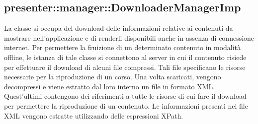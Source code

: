 \documentclass[../Tesi.tex]{subfiles}
\begin{document}
		\subsection{presenter::manager::DownloaderManagerImp}
		La classe  si occupa del download delle informazioni relative ai contenuti da mostrare nell'applicazione e di renderli disponibili anche in assenza di connessione internet. Per permettere la fruizione di un determinato contenuto in modalità offline, le istanza di tale classe si connettono al server in cui il contenuto risiede per effettuare il download di alcuni file compressi. Tali file specificano le risorse necessarie per la riproduzione di un corso. Una volta scaricati, vengono decompressi e viene estratto dal loro interno un file in formato XML. Quest'ultimi contengono dei riferimenti a tutte le risorse di cui fare il download per permettere la riproduzione di un contenuto. Le informazioni presenti nei file XML vengono estratte utilizzando delle espressioni XPath.
\end{document}
